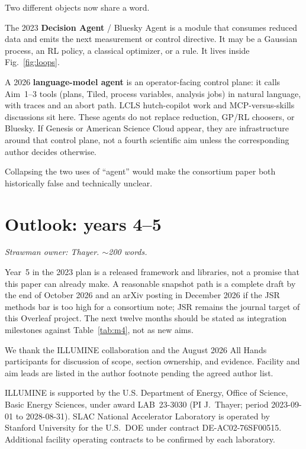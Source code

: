 \documentclass{iucrjournals}
\begin{document}
Two different objects now share a word.

The 2023 \textbf{Decision Agent} / Bluesky Agent is a module that consumes
reduced data and emits the next measurement or control directive. It may be a
Gaussian process, an RL policy, a classical optimizer, or a rule. It lives
inside Fig.~\ref{fig:loops}.

A 2026 \textbf{language-model agent} is an operator-facing control plane: it
calls Aim~1--3 tools (plans, Tiled, process variables, analysis jobs) in
natural language, with traces and an abort path. LCLS hutch-copilot work and
MCP-versus-skills discussions sit here. These agents do not replace reduction,
GP/RL choosers, or Bluesky. If Genesis or American Science Cloud appear, they
are infrastructure around that control plane, not a fourth scientific aim
unless the corresponding author decides otherwise.

Collapsing the two uses of ``agent'' would make the consortium paper both
historically false and technically unclear.

\section{Outlook: years 4--5}
\label{sec:outlook}

\textit{Strawman owner: Thayer. $\sim$200 words.}

Year~5 in the 2023 plan is a released framework and libraries, not a promise
that this paper can already make. A reasonable snapshot path is a complete
draft by the end of October 2026 and an arXiv posting in December 2026 if the
JSR methods bar is too high for a consortium note; JSR remains the journal
target of this Overleaf project. The next twelve months should be stated as
integration milestones against Table~\ref{tab:m4}, not as new aims.

\begin{acknowledgements}
We thank the ILLUMINE collaboration and the August 2026 All Hands participants
for discussion of scope, section ownership, and evidence. Facility and aim
leads are listed in the author footnote pending the agreed author list.
\end{acknowledgements}

\begin{funding}
ILLUMINE is supported by the U.S. Department of Energy, Office of Science,
Basic Energy Sciences, under award LAB~23-3030 (PI J.~Thayer; period
2023-09-01 to 2028-08-31). SLAC National Accelerator Laboratory is operated by
Stanford University for the U.S.\ DOE under contract DE-AC02-76SF00515.
Additional facility operating contracts to be confirmed by each laboratory.
\end{funding}
\end{document}
